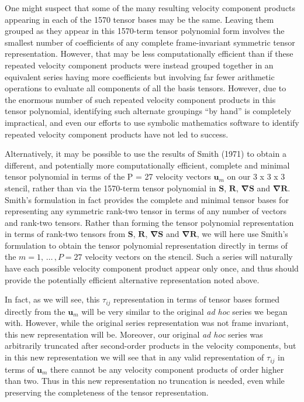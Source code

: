 One might suspect that some of the many resulting velocity component products appearing in each of the 1570 tensor bases may be the same. Leaving them grouped as they appear in this 1570-term tensor polynomial form involves the smallest number of coefficients of any complete frame-invariant symmetric tensor representation. However, that may be less computationally efficient than if these repeated velocity component products were instead grouped together in an equivalent series having more coefficients but involving far fewer arithmetic operations to evaluate all components of all the basis tensors. However, due to the enormous number of such repeated velocity component products in this tensor polynomial, identifying such alternate groupings “by hand” is completely impractical, and even our efforts to use symbolic mathematics software to identify repeated velocity component products have not led to success.

Alternatively, it may be possible to use the results of Smith (1971) to obtain a different, and potentially more computationally efficient, complete and minimal tensor polynomial in terms of the P = 27 velocity vectors $\mathbf{u}_m$ on our 3 x 3 x 3   stencil, rather than via the 1570-term tensor polynomial in $\mathbf{S}$, $\mathbf{R}$, $\mathbf{\nabla S}$ and $\mathbf{\nabla R}$. Smith’s formulation in fact provides the complete and minimal tensor bases for representing any symmetric rank-two tensor in terms of any number of vectors and rank-two tensors.  Rather than forming the tensor polynomial representation in terms of rank-two tensors from $\mathbf{S}$, $\mathbf{R}$, $\mathbf{\nabla S}$ and $\mathbf{\nabla R}$, we will here use Smith’s formulation to obtain the tensor polynomial representation directly in terms of the $m = 1, \,\dots\, , P = 27$ velocity vectors   on the stencil.  Such a series will naturally have each possible velocity component product appear only once, and thus should provide the potentially efficient alternative representation noted above.

In fact, as we will see, this $\tau_{ij}$ representation in terms of tensor bases formed directly from the $\mathbf{u}_m$  will be very similar to the original \textit{ad hoc}  series we began with.  However, while the original  series representation was not frame invariant, this new representation will be. Moreover, our original \textit{ad hoc} series was arbitrarily truncated after second-order products in the velocity components, but in this new representation we will see that in any valid representation of $\tau_{ij}$  in terms of $\mathbf{u}_m$ there cannot be any velocity component products of order higher than two. Thus in this new representation no truncation is needed, even while preserving the completeness of the tensor representation.

